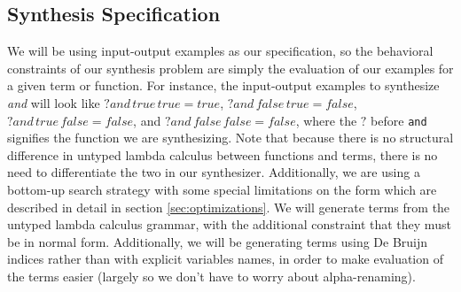 \subsection{Synthesis Specification}
We will be using input-output examples as our specification, so the
  behavioral constraints of our synthesis problem are simply the
  evaluation of our examples for a given term or function.
For instance, the input-output examples to synthesize \textit{and}
  will look like $?and \, true \, true = true$,
  $?and \, false \, true = false$,
  $?and \, true \, false = false$, and
  $?and \, false \, false = false$, where the $?$ before \texttt{and}
  signifies the function we are synthesizing.
Note that because there is no structural difference in untyped lambda
  calculus between functions and terms, there is no need to differentiate
  the two in our synthesizer.
Additionally, we are using a bottom-up search strategy with some
  special limitations on the form which are described in detail in
  section \ref{sec:optimizations}.
We will generate terms from the untyped lambda calculus grammar, with
  the additional constraint that they must be in normal form.
Additionally, we will be generating terms using De Bruijn indices rather
  than with explicit variables names, in order to make evaluation of the
  terms easier (largely so we don't have to worry about alpha-renaming).
